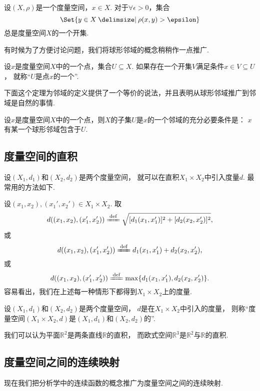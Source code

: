 \begin{proposition}
设\((X,\rho)\)是一个度量空间，\(x \in X\).
对于\(\forall\epsilon>0\)，集合\[
	\Set{ y \in X \given \rho(x,y) > \epsilon }
\]总是度量空间\(X\)的一个开集.
\end{proposition}

有时候为了方便讨论问题，我们将球形邻域的概念稍稍作一点推广.
\begin{definition}\label{definition:度量空间.邻域的概念}
设\(x\)是度量空间\(X\)中的一个点，集合\(U \subseteq X\).
如果存在一个开集\(V\)满足条件\(x \in V \subseteq U\)，
就称“\(U\)是点\(x\)的一个”.
\end{definition}
下面这个定理为邻域的定义提供了一个等价的说法，并且表明从球形邻域推广到邻域是自然的事情.
\begin{theorem}
设\(x\)是度量空间\(X\)中的一个点，则\(X\)的子集\(U\)是\(x\)的一个邻域的充分必要条件是：
\(x\)有某一个球形邻域包含于\(U\).
\end{theorem}

\subsection{度量空间的直积}
\begingroup
\def\A{X_1}\def\B{X_2}
\def\dA{d_1}\def\dB{d_2}
\def\X{(x_1,x_2)}
\def\Y{(x_1',x_2')}
\def\dAA{d_1(x_1,x_1')}
\def\dBB{d_2(x_2,x_2')}
设\((X_1,d_1)\)和\((X_2,d_2)\)是两个度量空间，
就可以在直积\(X_1 \times X_2\)中引入度量\(d\).
最常用的方法如下.

设\(\X,\Y\in X_1 \times X_2\).
取\[
	d(\X,\Y)
	\defeq
	\sqrt{[\dAA]^2+[\dBB]^2},
\]
或\[
	d(\X,\Y)
	\defeq
	\dAA+\dBB,
\]
或\[
	d(\X,\Y)
	\defeq
	\max\{\dAA,\dBB\}.
\]
容易看出，我们在上述每一种情形下都得到\(X_1 \times X_2\)上的度量.

\begin{definition}
设\((X_1,d_1)\)和\((X_2,d_2)\)是两个度量空间，
\(d\)是在\(X_1 \times X_2\)中引入的度量，
则称“度量空间\((X_1 \times X_2,d)\)是\((X_1,d_1)\)和\((X_2,d_2)\)的”.
\end{definition}

\begin{example}
我们可以认为平面\(\mathbb{R}^2\)是两条直线\(\mathbb{R}\)的直积，
而欧式空间\(\mathbb{R}^3\)是\(\mathbb{R}^2\)与\(\mathbb{R}\)的直积.
\end{example}
\endgroup

\subsection{度量空间之间的连续映射}
现在我们把分析学中的连续函数的概念推广为度量空间之间的连续映射.

